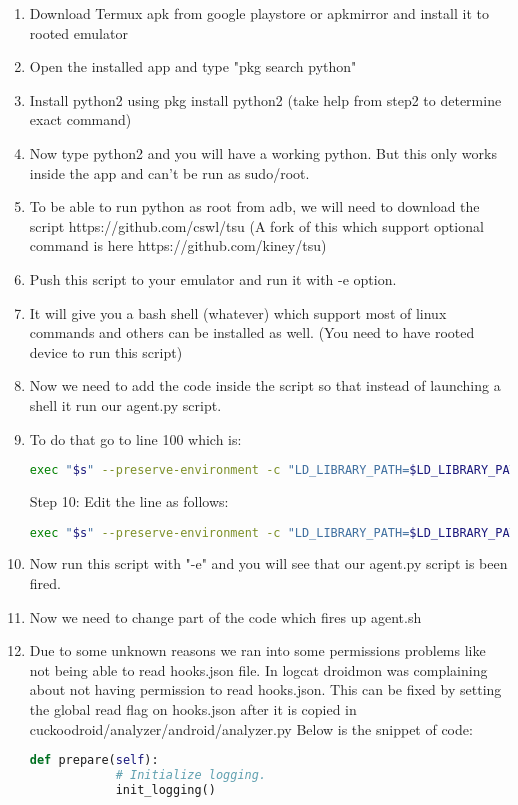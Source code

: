 \documentclass[../main.tex]{subfile}
\begin{document}
		\begin{enumerate}
		\item Download Termux apk from google playstore or apkmirror and install it to rooted emulator
		\item Open the installed app and type "pkg search python"
		\item Install python2 using pkg install python2 (take help from step2 to determine exact command)
		\item Now type python2 and you will have a working python. But this only works inside the app and can't be run as sudo/root.
		\item To be able to run python as root from adb, we will need to download the script https://github.com/cswl/tsu (A fork of this which support optional command is here https://github.com/kiney/tsu)
		\item Push this script to your emulator and run it with -e option.
		\item It will give you a bash shell (whatever) which support most of linux commands and others can be installed as well. (You need to have rooted device to run this script)
		\item Now we need to add the code inside the script so that instead of launching a shell it run our agent.py script.
		\item To do that go to line 100 which is:
		\begin{lstlisting}[language=bash]
		exec "$s" --preserve-environment -c "LD_LIBRARY_PATH=$LD_LIBRARY_PATH $ROOT_SHELL" 
		\end{lstlisting}
		Step 10: Edit the line as follows:
		\begin{lstlisting}[language=bash]
		exec "$s" --preserve-environment -c "LD_LIBRARY_PATH=$LD_LIBRARY_PATH python2 /data/local/agent.py" 
		\end{lstlisting}
		
		\item Now run this script with "-e" and you will see that our agent.py script is been fired.
		\item Now we need to change part of the code which fires up agent.sh
		\item Due to some unknown reasons we ran into some permissions problems like not being able to read hooks.json file. In logcat droidmon was complaining about not having permission to read hooks.json. This can be fixed by setting the global read flag on hooks.json after it is copied in cuckoodroid/analyzer/android/analyzer.py Below is the snippet of code:
		\begin{lstlisting}[language=python]
		def prepare(self):
			# Initialize logging.
			init_logging()
			

\end{lstlisting}
\end{enumerate}
\end{document}
